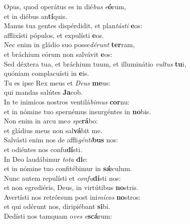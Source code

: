 \evenverse Opus, quod operátus es in dié\textit{bus} \textit{e}\textbf{ó}rum,~\*\\
\evenverse et in diébus an\textbf{tí}quis.\\
\oddverse Manus tua gentes dispérdidit, et plan\textit{tá}\textit{sti} \textbf{e}os:~\*\\
\oddverse afflixísti pópulos, et expulísti \textbf{e}os.\\
\evenverse Nec enim in gládio suo posse\textit{dé}\textit{runt} \textbf{ter}ram,~\*\\
\evenverse et bráchium eórum non salvávit \textbf{e}os:\\
\oddverse Sed déxtera tua, et bráchium tuum, et illuminátio \textit{vul}\textit{tus} \textbf{tu}i,~\*\\
\oddverse quóniam complacuísti in \textbf{e}is.\\
\evenverse Tu es ipse Rex meus et \textit{De}\textit{us} \textbf{me}us:~\*\\
\evenverse qui mandas salútes \textbf{Ja}cob.\\
\oddverse In te inimícos nostros ventilá\textit{bi}\textit{mus} \textbf{cor}nu:~\*\\
\oddverse et in nómine tuo spernémus insurgéntes in \textbf{no}bis.\\
\evenverse Non enim in arcu me\textit{o} \textit{spe}\textbf{rá}bo:~\*\\
\evenverse et gládius meus non sal\textbf{vá}bit me.\\
\oddverse Salvásti enim nos de affli\textit{gén}\textit{ti}\textbf{bus} nos:~\*\\
\oddverse et odiéntes nos confu\textbf{dí}sti.\\
\evenverse In Deo laudábimur \textit{to}\textit{ta} \textbf{di}e:~\*\\
\evenverse et in nómine tuo confitébimur in \textbf{sǽ}culum.\\
\oddverse Nunc autem repulísti et \textit{con}\textit{fu}\textbf{dí}sti nos:~\*\\
\oddverse et non egrediéris, Deus, in virtútibus \textbf{no}stris.\\
\evenverse Avertísti nos retrórsum post ini\textit{mí}\textit{cos} \textbf{no}stros:~\*\\
\evenverse et qui odérunt nos, diripiébant \textbf{si}bi.\\
\oddverse Dedísti nos tamquam o\textit{ves} \textit{e}\textbf{scá}rum:~\*\\
